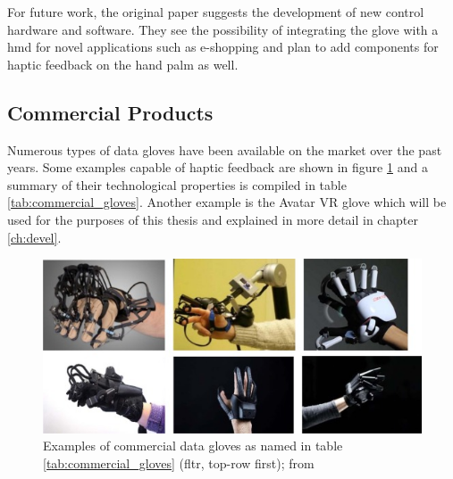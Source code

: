 \documentclass[hyperref, bachelorofscience]{cgvpub}
\begin{document}
For future work, the original paper suggests the development of new control hardware and software. They see the possibility of integrating the glove with a \acrfull{hmd} for novel applications such as e-shopping and plan to add components for haptic feedback on the hand palm as well.

\subsection{Commercial Products}
Numerous types of data gloves have been available on the market over the past years. Some examples capable of haptic feedback are shown in figure \ref{fig:commercial_gloves} and a summary of their technological properties is compiled in table \ref{tab:commercial_gloves}. Another example is the Avatar VR glove which will be used for the purposes of this thesis and explained in more detail in chapter \ref{ch:devel}.

\begin{figure}
	\includegraphics[width=\linewidth]{../pics/commercial_gloves}
	\caption{Examples of commercial data gloves as named in table \ref{tab:commercial_gloves} (fltr, top-row first); from \cite{wang19}}
	\label{fig:commercial_gloves}
\end{figure}
\end{document}
